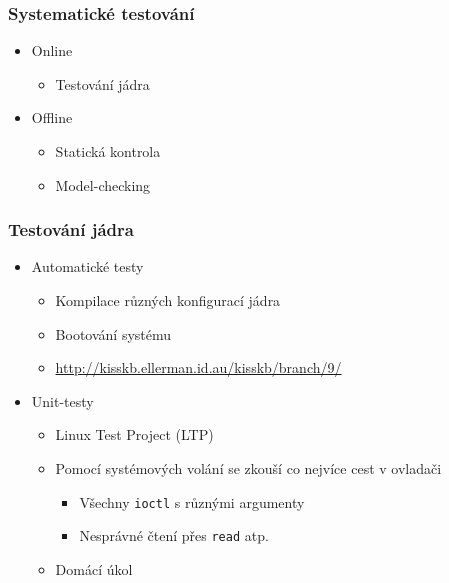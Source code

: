 


\subtitle{X. b.}
\date{30. 11. 2010}



\begin{frame}
  \titlepage
\end{frame}

\begin{frame}
  \frametitle{Systematické testování}

  \begin{itemize}
  \item Online
  \begin{itemize}
  \item Testování jádra
  \end{itemize}
  \item Offline
  \begin{itemize}
  \item Statická kontrola
  \item Model-checking
  \end{itemize}
  \end{itemize}

\end{frame}

\begin{frame}
  \frametitle{Testování jádra}

  \begin{itemize}
  \item Automatické testy
  \begin{itemize}
  \item Kompilace různých konfigurací jádra
  \item Bootování systému
  \item \url{http://kisskb.ellerman.id.au/kisskb/branch/9/}
  \end{itemize}
  \pause
  \item Unit-testy
  \begin{itemize}
  \item Linux Test Project (LTP)
  \item Pomocí systémových volání se zkouší co nejvíce cest v ovladači
    \begin{itemize}
    \item Všechny \texttt{ioctl} s různými argumenty
    \item Nesprávné čtení přes \texttt{read} atp.
    \end{itemize}
  \item Domácí úkol
  \end{itemize}
  \end{itemize}

\end{frame}

